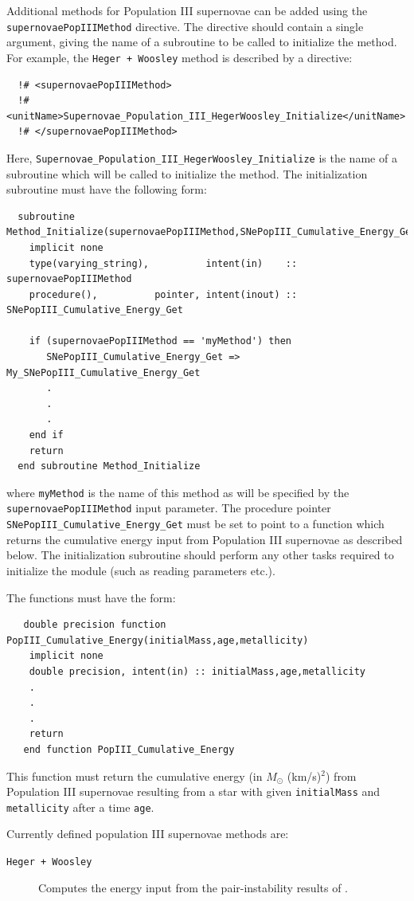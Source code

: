 Additional methods for Population III supernovae can be added using the {\tt supernovaePopIIIMethod} directive. The directive should contain a single argument, giving the name of a subroutine to be called to initialize the method. For example, the {\tt Heger + Woosley} method is described by a directive:
\begin{verbatim}
  !# <supernovaePopIIIMethod>
  !#  <unitName>Supernovae_Population_III_HegerWoosley_Initialize</unitName>
  !# </supernovaePopIIIMethod>
\end{verbatim}
Here, {\tt Supernovae\_Population\_III\_HegerWoosley\_Initialize} is the name of a subroutine which will be called to initialize the method. The initialization subroutine must have the following form:
\begin{verbatim}
  subroutine Method_Initialize(supernovaePopIIIMethod,SNePopIII_Cumulative_Energy_Get)
    implicit none
    type(varying_string),          intent(in)    :: supernovaePopIIIMethod
    procedure(),          pointer, intent(inout) :: SNePopIII_Cumulative_Energy_Get
    
    if (supernovaePopIIIMethod == 'myMethod') then
       SNePopIII_Cumulative_Energy_Get => My_SNePopIII_Cumulative_Energy_Get
       .
       .
       .
    end if
    return
  end subroutine Method_Initialize
\end{verbatim}
where {\tt myMethod} is the name of this method as will be specified by the {\tt supernovaePopIIIMethod} input parameter. The procedure pointer {\tt SNePopIII\_Cumulative\_Energy\_Get} must be set to point to a function which returns the cumulative energy input from Population III supernovae as described below. The initialization subroutine should perform any other tasks required to initialize the module (such as reading parameters etc.).

The functions must have the form:
\begin{verbatim}
   double precision function PopIII_Cumulative_Energy(initialMass,age,metallicity)
    implicit none
    double precision, intent(in) :: initialMass,age,metallicity
    .
    .
    .
    return
   end function PopIII_Cumulative_Energy 
\end{verbatim}
This function must return the cumulative energy (in $M_\odot$ (km/s)$^2$) from Population III supernovae resulting from a star with given {\tt initialMass} and {\tt metallicity} after a time {\tt age}.

Currently defined population III supernovae methods are:
\begin{description}
 \item [{\tt Heger + Woosley}] Computes the energy input from the pair-instability results of \cite{heger_nucleosynthetic_2002}.
\end{description}

